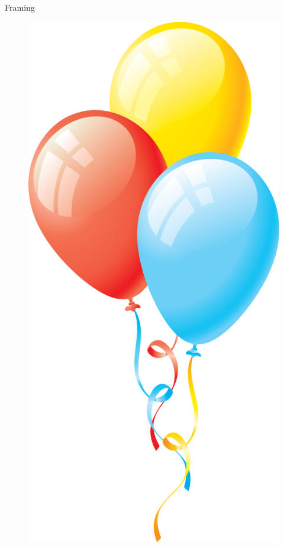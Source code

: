 \documentclass[10pt]{beamer}
\begin{document}
\begin{frame}{Framing}
  \begin{figure}
    \includegraphics[scale=0.2]{3_intermolecular_forces/balloons.png}
  \end{figure}
\end{frame}
\end{document}
